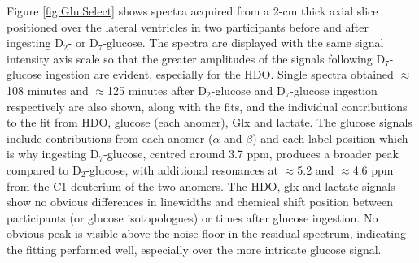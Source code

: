 \documentclass[class=article, crop=false]{standalone}
\begin{document}
Figure \ref{fig:Glu:Select} shows spectra acquired from a 2-cm thick axial slice positioned over the lateral ventricles in two participants before and after ingesting D$_2$- or D$_7$-glucose. The spectra are displayed with the same signal intensity axis scale so that the greater amplitudes of the signals following D$_7$-glucose ingestion are evident, especially for the HDO. Single spectra obtained $\approx$108 minutes and $\approx$125 minutes after D$_2$-glucose and D$_7$-glucose ingestion respectively are also shown, along with the fits, and the individual contributions to the fit from HDO, glucose (each anomer), Glx and lactate. The glucose signals include contributions from each anomer ($\alpha$ and $\beta$) and each label position which is why ingesting D$_7$-glucose, centred around 3.7 ppm, produces a broader peak compared to D$_2$-glucose, with additional resonances at $\approx$5.2 and $\approx$4.6 ppm from the C1 deuterium of the two anomers. The HDO, glx and lactate signals show no obvious differences in linewidths and chemical shift position between participants (or glucose isotopologues) or times after glucose ingestion. No obvious peak is visible above the noise floor in the residual spectrum, indicating the fitting performed well, especially over the more intricate glucose signal.
\end{document}

